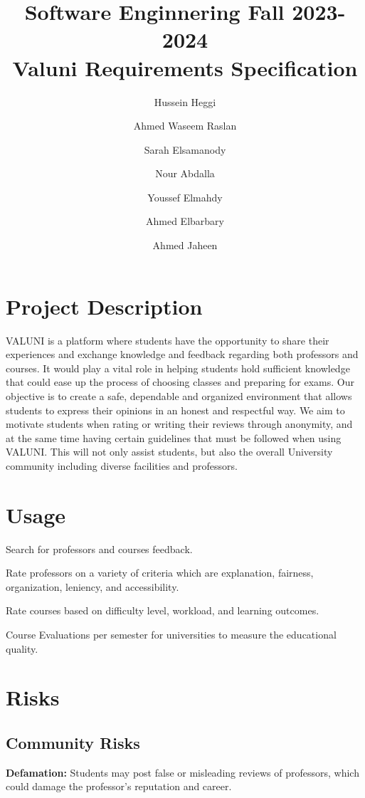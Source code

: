 \documentclass{article}
\title{Software Enginnering Fall 2023-2024 \\ Valuni Requirements Specification}
\author{  
Hussein Heggi 	\and
Ahmed Waseem Raslan 	\and
Sarah Elsamanody 	\and
Nour Abdalla 	\and
Youssef Elmahdy	\and
Ahmed Elbarbary	\and 
Ahmed Jaheen}
\begin{document}
\begin{titlingpage}
\maketitle
\end{titlingpage}

\break

\tableofcontents

\break

\section{Project Description}
\quad VALUNI is a platform where students have the opportunity to share their experiences and exchange knowledge and feedback regarding both professors and courses.  It would play a vital role in helping students hold sufficient knowledge that could ease up the process of choosing classes and preparing for exams. Our objective is to create a safe, dependable and organized environment that allows students to express their opinions in an honest and respectful way. We aim to motivate students when rating or writing their reviews through anonymity, and at the same time having certain guidelines that must be followed when using VALUNI. This will not only assist students, but also the overall University community including diverse facilities and professors. 

\section{Usage}
Search for professors and courses feedback.  

Rate professors on a variety of criteria which are explanation, fairness, organization, leniency, and accessibility.

Rate courses based on difficulty level, workload, and learning outcomes.

Course Evaluations per semester for universities to measure the educational quality.

\section{Risks} 

\subsection{Community Risks}
\textbf{Defamation:} Students may post false or misleading reviews of professors, which could damage the professor's reputation and career.
\end{document}
